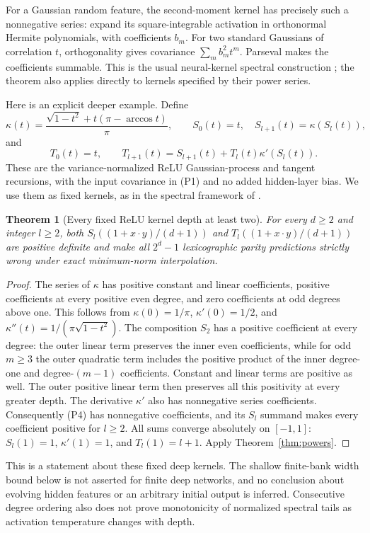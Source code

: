 \documentclass[11pt]{article}
\newtheorem{theorem}{Theorem}\newtheorem{lemma}[theorem]{Lemma}
\begin{document}
For a Gaussian random feature, the second-moment kernel has precisely
such a nonnegative series: expand its square-integrable activation in
orthonormal Hermite polynomials, with coefficients $b_m$. For two
standard Gaussians of correlation $t$, orthogonality gives covariance
$\sum_m b_m^2t^m$. Parseval makes the coefficients summable. This is
the usual neural-kernel spectral construction \cite{yang}; the theorem
also applies directly to kernels specified by their power series.

Here is an explicit deeper example. Define
\[
 \kappa(t)=\frac{\sqrt{1-t^2}+t(\pi-\arccos t)}\pi,\qquad
 S_0(t)=t,\quad S_{l+1}(t)=\kappa(S_l(t)),                     \tag{P3}
\]
and
\[
 T_0(t)=t,\qquad
 T_{l+1}(t)=S_{l+1}(t)+T_l(t)\kappa'(S_l(t)).                 \tag{P4}
\]
These are the variance-normalized ReLU Gaussian-process and tangent
recursions, with the input covariance in (P1) and no added hidden-layer
bias. We use them as fixed kernels, as in the spectral framework of
\cite{yang}.

\begin{theorem}[Every fixed ReLU kernel depth at least two]
For every $d\ge2$ and integer $l\ge2$, both
$S_l((1+x\cdot y)/(d+1))$ and
$T_l((1+x\cdot y)/(d+1))$ are positive definite and make all
$2^d-1$ lexicographic parity predictions strictly wrong under exact
minimum-norm interpolation.
\end{theorem}
\begin{proof}
The series of $\kappa$ has positive constant and linear coefficients,
positive coefficients at every positive even degree, and zero coefficients
at odd degrees above one. This follows from
$\kappa(0)=1/\pi$, $\kappa'(0)=1/2$, and
$\kappa''(t)=1/(\pi\sqrt{1-t^2})$.
The composition $S_2$ has a positive coefficient at every degree:
the outer linear term preserves the inner even coefficients, while
for odd $m\ge3$ the outer quadratic term includes the positive product
of the inner degree-one and degree-$(m-1)$ coefficients. Constant and
linear terms are positive as well. The outer positive linear term then
preserves all this positivity at every greater depth.
The derivative $\kappa'$ also has nonnegative series coefficients.
Consequently (P4) has nonnegative coefficients, and its $S_l$ summand
makes every coefficient positive for $l\ge2$.
All sums converge absolutely on $[-1,1]$: $S_l(1)=1$,
$\kappa'(1)=1$, and $T_l(1)=l+1$. Apply
Theorem~\ref{thm:powers}.
\end{proof}
This is a statement about these fixed deep kernels. The shallow finite-bank
width bound below is not asserted for finite deep networks, and no
conclusion about evolving hidden features or an arbitrary initial output
is inferred. Consecutive degree ordering also does not prove monotonicity
of normalized spectral tails as activation temperature changes with depth.
\end{document}
